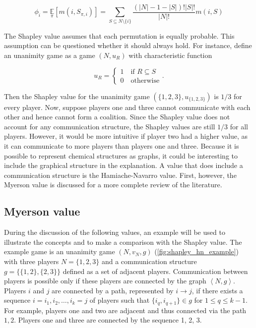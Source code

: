 \begin{equation}
    \label{eq:Shapley}
    \phi_i = \underset{\pi}{\mathbb{E}} \left[ m\left(i, S_{\pi, i} \right) \right]
	= \sum_{S \subseteq N \setminus \{i\}} \frac{\left(|N| - 1 - |S|\right)!|S|!}{|N|!} m(i, S)
\end{equation}



The Shapley value assumes that each permutation is equally probable. 
This assumption can be questioned whether it should always hold. For instance, 
define an unanimity game as a game $(N, u_R)$ with characteristic function


\begin{equation}
	u_R = \begin{cases}
		1 \quad \text{if } R \subseteq S \\
		0 \quad \text{otherwise}
	\end{cases}.
\end{equation}


Then the Shapley value for the unanimity game $(\{1, 2, 3\}, u_{\{1,2,3\}})$ is $1/3$ for every player.\cite{hamiache_value_1999}
Now, suppose players one and three cannot communicate with each other and hence cannot form a coalition.
Since the Shapley value does not account for any communication structure, the Shapley values are still
$1/3$ for all players. However, it would be more intuitive if player two had a higher value, as it can
communicate to more players than players one and three. Because it is possible to represent chemical
structures as graphs, it could be interesting to include the graphical structure in the explanation. A
value that does include a communication structure is the Hamiache-Navarro value.
First, however, the Myerson value is discussed for a more complete review of the literature.
\cite{hamiache_value_1999, hamiache_associated_2020}


\subsection{Myerson value}


During the discussion of the following values, an example will be used to illustrate 
the concepts and to make a comparison with the Shapley value. 
The example game is an unanimity game $(N, v_N, g)$ (\cref{fig:shapley_hn_example}) 
with three players $N = \{1, 2, 3\}$ and a communication structure $g = \{\{1, 2\}, \{2, 3\}\}$ 
defined as a set of adjacent players.\cite{hamiache_associated_2020} Communication 
between players is possible only if these players are connected by the graph 
$\left<N, g\right>$. Players $i$ and $j$ are connected by a path, represented by $i \rightarrow j$, 
if there exists a sequence $i = i_1, i_2, \dots, i_k = j$ of players such 
that $\{i_q, i_{q+1}\} \in g$ for $1 \le q \le k - 1$. For example, 
players one and two are adjacent and thus connected via the path $1, 2$. 
Players one and three are connected by the sequence 1, 2, 3.\cite{hamiache_value_1999, hamiache_associated_2020} 



